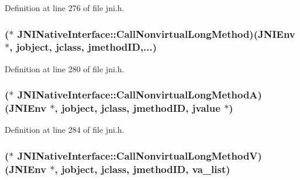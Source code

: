 Definition at line 276 of file jni.\-h.

\hypertarget{struct_j_n_i_native_interface_ac107ef60025a0936e003cd1c912706a7}{
\subsubsection[{Call\-Nonvirtual\-Long\-Method}]{($\ast$ J\-N\-I\-Native\-Interface\-::\-Call\-Nonvirtual\-Long\-Method)({\bf J\-N\-I\-Env} $\ast$, {\bf jobject}, {\bf jclass}, {\bf jmethod\-I\-D},...)}}\label{struct_j_n_i_native_interface_ac107ef60025a0936e003cd1c912706a7}


Definition at line 280 of file jni.\-h.

\hypertarget{struct_j_n_i_native_interface_aa03debe9361fa56800b5d08de67db5ca}{
\subsubsection[{Call\-Nonvirtual\-Long\-Method\-A}]{($\ast$ J\-N\-I\-Native\-Interface\-::\-Call\-Nonvirtual\-Long\-Method\-A)({\bf J\-N\-I\-Env} $\ast$, {\bf jobject}, {\bf jclass}, {\bf jmethod\-I\-D}, {\bf jvalue} $\ast$)}}\label{struct_j_n_i_native_interface_aa03debe9361fa56800b5d08de67db5ca}


Definition at line 284 of file jni.\-h.

\hypertarget{struct_j_n_i_native_interface_a81241d77f6d18236ca71cab0169d31c8}{
\subsubsection[{Call\-Nonvirtual\-Long\-Method\-V}]{($\ast$ J\-N\-I\-Native\-Interface\-::\-Call\-Nonvirtual\-Long\-Method\-V)({\bf J\-N\-I\-Env} $\ast$, {\bf jobject}, {\bf jclass}, {\bf jmethod\-I\-D}, va\-\_\-list)}}\label{struct_j_n_i_native_interface_a81241d77f6d18236ca71cab0169d31c8}


